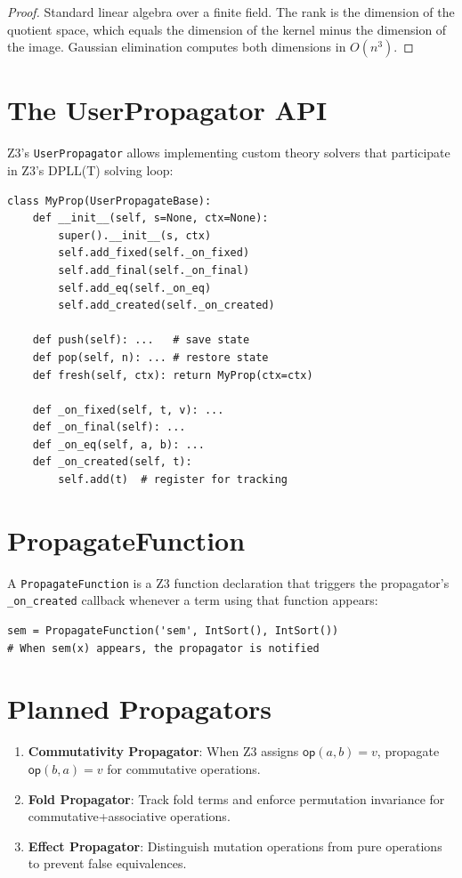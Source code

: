 \begin{proof}
Standard linear algebra over a finite field.  The rank is the
dimension of the quotient space, which equals the dimension of the
kernel minus the dimension of the image.  Gaussian elimination
computes both dimensions in $O(n^3)$.
\end{proof}
\label{ch:z3-theories}

\section{The UserPropagator API}

Z3's \texttt{UserPropagator} allows implementing custom theory
solvers that participate in Z3's DPLL(T) solving loop:

\begin{lstlisting}[caption={UserPropagator skeleton}]
class MyProp(UserPropagateBase):
    def __init__(self, s=None, ctx=None):
        super().__init__(s, ctx)
        self.add_fixed(self._on_fixed)
        self.add_final(self._on_final)
        self.add_eq(self._on_eq)
        self.add_created(self._on_created)

    def push(self): ...   # save state
    def pop(self, n): ... # restore state
    def fresh(self, ctx): return MyProp(ctx=ctx)

    def _on_fixed(self, t, v): ...
    def _on_final(self): ...
    def _on_eq(self, a, b): ...
    def _on_created(self, t):
        self.add(t)  # register for tracking
\end{lstlisting}

\section{PropagateFunction}

A \texttt{PropagateFunction} is a Z3 function declaration that triggers
the propagator's \texttt{\_on\_created} callback whenever a term using
that function appears:

\begin{lstlisting}
sem = PropagateFunction('sem', IntSort(), IntSort())
# When sem(x) appears, the propagator is notified
\end{lstlisting}

\section{Planned Propagators}

\begin{enumerate}
  \item \textbf{Commutativity Propagator}: When Z3 assigns
    $\mathsf{op}(a, b) = v$, propagate $\mathsf{op}(b, a) = v$
    for commutative operations.
  \item \textbf{Fold Propagator}: Track fold terms and enforce
    permutation invariance for commutative+associative operations.
  \item \textbf{Effect Propagator}: Distinguish mutation operations
    from pure operations to prevent false equivalences.
\end{enumerate}


